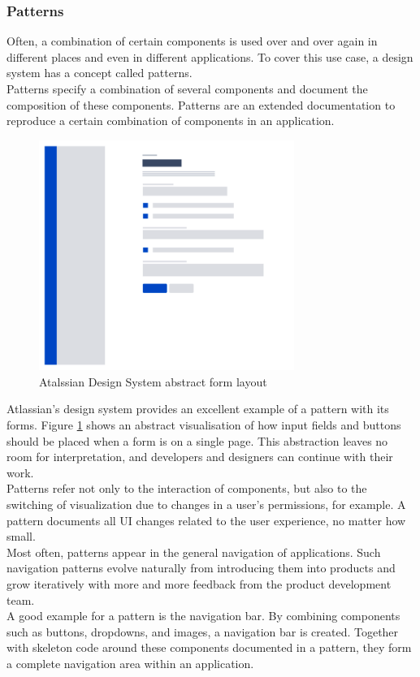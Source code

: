 \subsubsection{Patterns} \label{patterns}
Often, a combination of certain components is used over and over again in different places and even in different applications. To cover this use case, a design system has a concept called patterns.\\ 
Patterns specify a combination of several components and document the composition of these components. Patterns are an extended documentation to reproduce a certain combination of components in an application. \\
\begin{figure}[htbp]
	\centerline{\includegraphics[height=7.5cm]{images/atlassian_abstract_form.png}}
	\caption{Atalssian Design System abstract form layout \cite{atlassian_design_system_atlassian_nodate}}
	\label{atlassian_form_layout}
\end{figure}
Atlassian's design system provides an excellent example of a pattern with its forms. Figure \ref{atlassian_form_layout} shows an abstract visualisation of how input fields and buttons should be placed when a form is on a single page. This abstraction leaves no room for interpretation, and developers and designers can continue with their work. \\
Patterns refer not only to the interaction of components, but also to the switching of visualization due to changes in a user's permissions, for example. A pattern documents all UI changes related to the user experience, no matter how small. \cite{vesselov_building_2019} \\
Most often, patterns appear in the general navigation of applications. Such navigation patterns evolve naturally from introducing them into products and grow iteratively with more and more feedback from the product development team.\\
A good example for a pattern is the navigation bar. By combining components such as buttons, dropdowns, and images, a navigation bar is created. Together with skeleton code around these components documented in a pattern, they form a complete navigation area within an application. 
